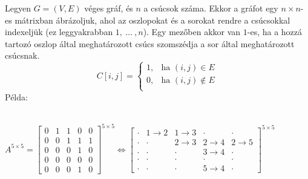 \documentclass[margin=0px]{article}
\begin{document}
    \noindent Legyen $G = (V, E)$ véges gráf, és $n$ a csúcsok száma. Ekkor a gráfot egy $n \times n$-es mátrixban ábrázoljuk, ahol az oszlopokat és a sorokat rendre a csúcsokkal indexeljük (ez leggyakrabban $1,\ \ldots\ ,n$). Egy mezőben akkor van $1$-es, ha a hozzá tartozó oszlop által meghatározott csúcs szomszédja a sor által meghatározott csúcsnak.
    \[
        C[i,j] = \left\{\begin{array}{lr}
        1, & \text{ha } (i, j) \in E\\
        0, & \text{ha } (i, j) \not\in E\\
        \end{array}\right.
    \]
    Példa:\\\\
    {\footnotesize
    $A^{5 \times 5} = \left[\begin{array}{ccccc}
      0 & 1 & 1 & 0 & 0 \\
      0 & 0 & 1 & 1 & 1 \\
      0 & 0 & 0 & 1 & 0 \\
      0 & 0 & 0 & 0 & 0 \\
      0 & 0 & 0 & 1 & 0
    \end{array}\right]^{5 \times 5} \Leftrightarrow \left[\begin{array}{ccccc}
       \cdot & 1 \rightarrow 2 & 1 \rightarrow 3 & \cdot & \cdot \\
       \cdot & \cdot & 2 \rightarrow 3 & 2 \rightarrow 4 & 2 \rightarrow 5 \\
       \cdot & \cdot & \cdot & 3 \rightarrow 4 & \cdot \\
       \cdot & \cdot & \cdot & \cdot & \cdot \\
       \cdot & \cdot & \cdot & 5 \rightarrow 4 & \cdot
    \end{array}\right]^{5 \times 5}$
    }\\
\end{document}
